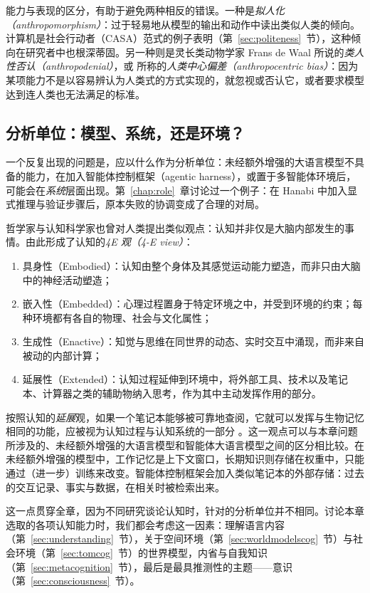 能力与表现的区分，有助于避免两种相反的错误。一种是\emph{拟人化（anthropomorphism）}：过于轻易地从模型的输出和动作中读出类似人类的倾向。计算机是社会行动者（CASA）范式的例子表明（第~\ref{sec:politeness}~节），这种倾向在研究者中也根深蒂固。另一种则是灵长类动物学家 Frans de Waal 所说的\emph{类人性否认（anthropodenial）}\citep{deWaal1999anthropo}，或 \citet{milliere2026anth} 所称的\emph{人类中心偏差（anthropocentric bias）}：因为某项能力不是以容易辨认为人类式的方式实现的，就忽视或否认它，或者要求模型达到连人类也无法满足的标准。


\subsection{分析单位：模型、系统，还是环境？} \label{sec:unit}
一个反复出现的问题是，应以什么作为分析单位：未经额外增强的大语言模型不具备的能力，在加入智能体控制框架（agentic harness），或置于多智能体环境后，可能会在\emph{系统}层面出现。第~\ref{chap:role}~章讨论过一个例子：在 Hanabi 中加入显式推理与验证步骤后，原本失败的协调变成了合理的对局。

哲学家与认知科学家也曾对人类提出类似观点：认知并非仅是大脑内部发生的事情。由此形成了认知的\emph{4E 观（4-E view）}\citep{noe2009outofourheads, Carney2020foure}：
\begin{enumerate}
    \item 具身性（Embodied）：认知由整个身体及其感觉运动能力塑造，而非只由大脑中的神经活动塑造；
    \item 嵌入性（Embedded）：心理过程置身于特定环境之中，并受到环境的约束；每种环境都有各自的物理、社会与文化属性；
    \item 生成性（Enactive）：知觉与思维在同世界的动态、实时交互中涌现，而非来自被动的内部计算；
    \item 延展性（Extended）：认知过程延伸到环境中，将外部工具、技术以及笔记本、计算器之类的辅助物纳入思考，作为其中主动发挥作用的部分。
\end{enumerate}

按照认知的\emph{延展}观，如果一个笔记本能够被可靠地查阅，它就可以发挥与生物记忆相同的功能，应被视为认知过程与认知系统的一部分 \citep{clark1998extended}。这一观点可以与本章问题所涉及的、未经额外增强的大语言模型和智能体大语言模型之间的区分相比较。在未经额外增强的模型中，工作记忆是上下文窗口，长期知识则存储在权重中，只能通过（进一步）训练来改变。智能体控制框架会加入类似笔记本的外部存储：过去的交互记录、事实与数据，在相关时被检索出来。

这一点贯穿全章，因为不同研究谈论认知时，针对的分析单位并不相同。讨论本章选取的各项认知能力时，我们都会考虑这一因素：理解语言内容（第~\ref{sec:understanding}~节），关于空间环境（第~\ref{sec:worldmodelscog}~节）与社会环境（第~\ref{sec:tomcog}~节）的世界模型，内省与自我知识（第~\ref{sec:metacognition}~节），最后是最具推测性的主题——意识（第~\ref{sec:consciousness}~节）。


